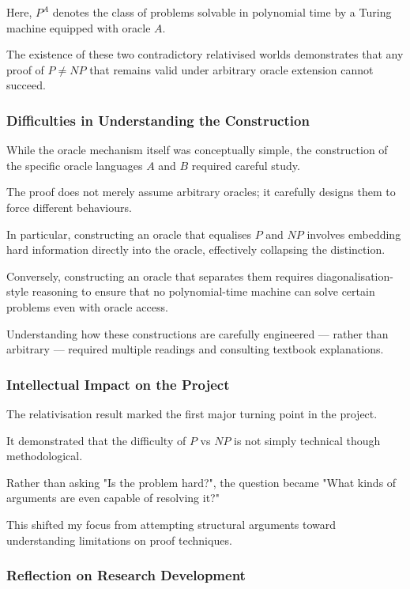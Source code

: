 \documentclass[12pt]{article}
\begin{document}
Here, $P^A$ denotes the class of problems solvable in polynomial time by a Turing machine equipped with oracle $A$.

The existence of these two contradictory relativised worlds demonstrates that any proof of $P \neq NP$ that remains valid under arbitrary oracle extension cannot succeed.

\subsubsection*{Difficulties in Understanding the Construction}

While the oracle mechanism itself was conceptually simple, the construction of the specific oracle languages $A$ and $B$ required careful study.

The proof does not merely assume arbitrary oracles; it carefully designs them to force different behaviours.

In particular, constructing an oracle that equalises $P$ and $NP$ involves embedding hard information directly into the oracle, effectively collapsing the distinction.

Conversely, constructing an oracle that separates them requires diagonalisation-style reasoning to ensure that no polynomial-time machine can solve certain problems even with oracle access.

Understanding how these constructions are carefully engineered --- rather than arbitrary --- required multiple readings and consulting textbook explanations.

\subsubsection*{Intellectual Impact on the Project}

The relativisation result marked the first major turning point in the project.

It demonstrated that the difficulty of $P$ vs $NP$ is not simply technical though methodological.

Rather than asking "Is the problem hard?", the question became "What kinds of arguments are even capable of resolving it?"

This shifted my focus from attempting structural arguments toward understanding limitations on proof techniques.

\subsubsection*{Reflection on Research Development}
\end{document}
